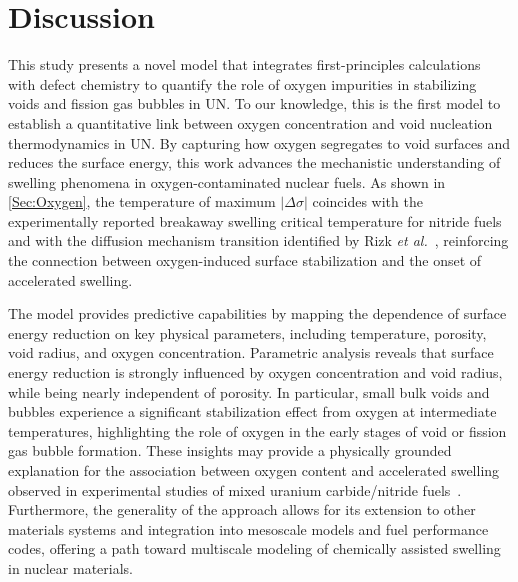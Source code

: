 \documentclass[preprint,12pt,sort&compress]{elsarticle}
\newcommand{\?}{\stackrel{?}{=}}
\begin{document}
\section{Discussion}
\label{Sec:Discuss}

This study presents a novel model that integrates first-principles calculations with defect chemistry to quantify the role of oxygen impurities in stabilizing voids and fission gas bubbles in UN. To our knowledge, this is the first model to establish a quantitative link between oxygen concentration and void nucleation thermodynamics in UN. By capturing how oxygen segregates to void surfaces and reduces the surface energy, this work advances the mechanistic understanding of swelling phenomena in oxygen-contaminated nuclear fuels. As shown in \cref{Sec:Oxygen}, the temperature of maximum $|\Delta \sigma|$ coincides with the experimentally reported breakaway swelling critical temperature for nitride fuels~\cite{Ronchi1978} and with the diffusion mechanism transition identified by Rizk \textit{et al.}~\cite{Rizk2025}, reinforcing the connection between oxygen-induced surface stabilization and the onset of accelerated swelling.


The model provides predictive capabilities by mapping the dependence of surface energy reduction on key physical parameters, including temperature, porosity, void radius, and oxygen concentration. Parametric analysis reveals that surface energy reduction is strongly influenced by oxygen concentration and void radius, while being nearly independent of porosity. In particular, small bulk voids and bubbles experience a significant stabilization effect from oxygen at intermediate temperatures, highlighting the role of oxygen in the early stages of void or fission gas bubble formation. These insights may provide a physically grounded explanation for the association between oxygen content and accelerated swelling observed in experimental studies of mixed uranium carbide/nitride fuels~\cite{Rogozkin2003}. Furthermore, the generality of the approach allows for its extension to other materials systems and integration into mesoscale models and fuel performance codes, offering a path toward multiscale modeling of chemically assisted swelling in nuclear materials.
\end{document}
